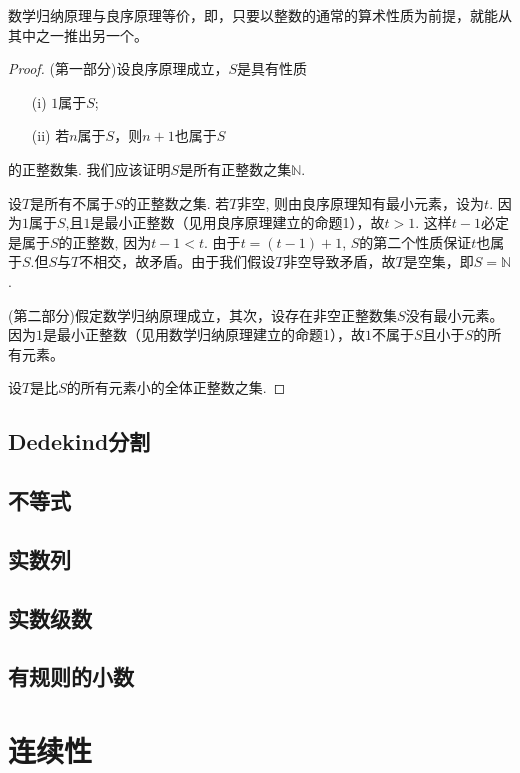 \begin{proposition}{}{}
数学归纳原理与良序原理等价，即，只要以整数的通常的算术性质为前提，就能从其中之一推出另一个。
\end{proposition}
\begin{proof}
(第一部分)设良序原理成立，$S$是具有性质
\begin{enumerate}
\item[(i)] $1$属于$S$;
\item[(ii)] 若$n$属于$S$，则$n+1$也属于$S$
\end{enumerate}
的正整数集. 我们应该证明$S$是所有正整数之集$\mathbb{N}$.

设$T$是所有不属于$S$的正整数之集. 若$T$非空, 则由良序原理知有最小元素，设为$t$. 因为$1$属于$S$,且$1$是最小正整数（见用良序原理建立的命题1），故$t > 1$. 这样$t-1$必定是属于$S$的正整数, 因为$t-1<t$. 由于$t = (t-1) + 1$, $S$的第二个性质保证$t$也属于$S$.但$S$与$T$不相交，故矛盾。由于我们假设$T$非空导致矛盾，故$T$是空集，即$S = \mathbb{N}$.

(第二部分)假定数学归纳原理成立，其次，设存在非空正整数集$S$没有最小元素。因为$1$是最小正整数（见用数学归纳原理建立的命题1），故$1$不属于$S$且小于$S$的所有元素。

设$T$是比$S$的所有元素小的全体正整数之集.
\end{proof}

\section{Dedekind分割}\label{sec0100102}


\section{不等式}\label{sec0100103}

\section{实数列}\label{sec0100104}

\section{实数级数}\label{sec0100105}

\section{有规则的小数}\label{sec0100106}


\chapter{连续性}\label{ch01002}


